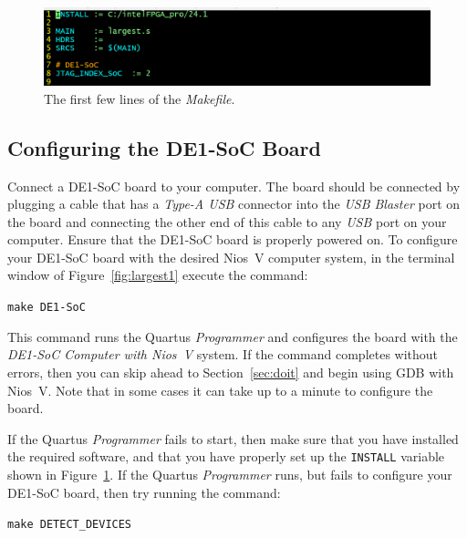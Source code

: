 \documentclass[11pt, twoside, pdftex]{article}
\begin{document}
\begin{figure}[h]
    \begin{center}
        \includegraphics[scale=.5]{figures/firstfew.png}
        \caption{The first few lines of the {\it Makefile}.}
        \label{fig:firstfew}
    \end{center}
\end{figure}

\subsection{Configuring the DE1-SoC Board}
\label{sec:config}

Connect a DE1-SoC board to your computer. The board should be connected by plugging
a cable that has a {\it Type-A USB} connector into the {\it USB Blaster} port on the board 
and connecting the other end of this cable to any {\it USB} port on your computer. Ensure 
that the DE1-SoC board is properly powered on.
To configure your DE1-SoC board with the desired Nios~V computer system, in the terminal
window of Figure~\ref{fig:largest1} execute the command:

\texttt{make DE1-SoC} 

This command runs the Quartus {\it Programmer} and configures the board with the 
{\it DE1-SoC Computer with Nios~V} system. If the command completes without errors, then you 
can skip ahead to Section~\ref{sec:doit} and begin using GDB with Nios~V. Note that in
some cases it can take up to a minute to configure the board. 

If the Quartus {\it Programmer} fails to start, then make sure that you have installed the
required software, and that you have properly set up the \texttt{INSTALL} variable shown
in Figure~\ref{fig:firstfew}. If the Quartus {\it Programmer} runs, but fails to configure 
your DE1-SoC board, then try running the command:

\texttt{make DETECT\_DEVICES}
\end{document}
